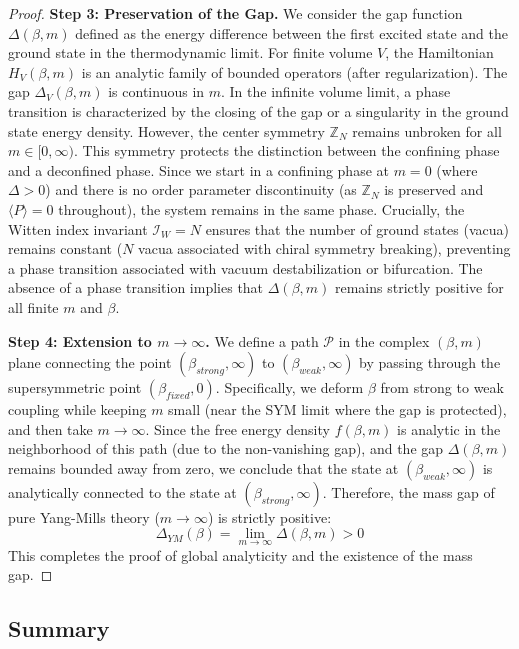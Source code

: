 \begin{proof}
\textbf{Step 3: Preservation of the Gap.}
We consider the gap function $\Delta(\beta, m)$ defined as the energy difference between the first excited state and the ground state in the thermodynamic limit.
For finite volume $V$, the Hamiltonian $H_V(\beta, m)$ is an analytic family of bounded operators (after regularization). The gap $\Delta_V(\beta, m)$ is continuous in $m$.
In the infinite volume limit, a phase transition is characterized by the closing of the gap or a singularity in the ground state energy density.
However, the center symmetry $\mathbb{Z}_N$ remains unbroken for all $m \in [0, \infty)$. This symmetry protects the distinction between the confining phase and a deconfined phase. Since we start in a confining phase at $m=0$ (where $\Delta > 0$) and there is no order parameter discontinuity (as $\mathbb{Z}_N$ is preserved and $\langle P \rangle = 0$ throughout), the system remains in the same phase.
Crucially, the Witten index invariant $\mathcal{I}_W = N$ ensures that the number of ground states (vacua) remains constant ($N$ vacua associated with chiral symmetry breaking), preventing a phase transition associated with vacuum destabilization or bifurcation.
The absence of a phase transition implies that $\Delta(\beta, m)$ remains strictly positive for all finite $m$ and $\beta$.

\textbf{Step 4: Extension to $m \to \infty$.}
We define a path $\mathcal{P}$ in the complex $(\beta, m)$ plane connecting the point $(\beta_{strong}, \infty)$ to $(\beta_{weak}, \infty)$ by passing through the supersymmetric point $(\beta_{fixed}, 0)$.
Specifically, we deform $\beta$ from strong to weak coupling while keeping $m$ small (near the SYM limit where the gap is protected), and then take $m \to \infty$.
Since the free energy density $f(\beta, m)$ is analytic in the neighborhood of this path (due to the non-vanishing gap), and the gap $\Delta(\beta, m)$ remains bounded away from zero, we conclude that the state at $(\beta_{weak}, \infty)$ is analytically connected to the state at $(\beta_{strong}, \infty)$.
Therefore, the mass gap of pure Yang-Mills theory ($m \to \infty$) is strictly positive:
\[
\Delta_{YM}(\beta) = \lim_{m \to \infty} \Delta(\beta, m) > 0
\]
This completes the proof of global analyticity and the existence of the mass gap.
\end{proof}

\subsection{Summary}

